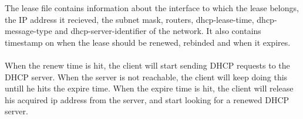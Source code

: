 

The lease file contains information about the interface to which the lease belongs, the IP address it recieved, the subnet mask, routers, dhcp-lease-time, dhcp-message-type and dhcp-server-identifier of the network. It also contains timestamp on when the lease should be renewed, rebinded and when it expires. \\ \\

When the renew time is hit, the client will start sending DHCP requests to the DHCP server. When the server is not reachable, the client will keep doing this untill he hits the expire time. When the expire time is hit, the client will release his acquired ip address from the server, and start looking for a renewed DHCP server.

